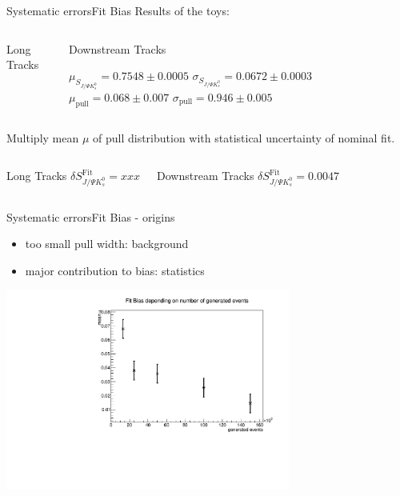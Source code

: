 \documentclass{beamer}
\newcommand{\SJPsi}{S_{J/\Psi K_s^0}}
\begin{document}
	\begin{frame}{Systematic errors}{Fit Bias}
	Results of the toys:
	\begin{columns}
	\begin{block}{Long Tracks}
    \centering
       
    \end{block}
	\begin{block}{Downstream Tracks}
    
        $\mu_{\SJPsi} = 0.7548 \pm 0.0005$
        $\sigma_{\SJPsi} = 0.0672 \pm 0.0003$
        $\mu_{\text{pull}} = 0.068 \pm 0.007$
        $\sigma_{\text{pull}} = 0.946 \pm 0.005$
    \end{block}
    \end{columns}
	\vspace{0.5cm} 
	Multiply mean $\mu$ of pull distribution with statistical uncertainty of nominal fit.
	\begin{columns}
	\begin{block}{Long Tracks}
    \centering
        $\delta\SJPsi^{\text{Fit}} = xxx$
    \end{block}
	\begin{block}{Downstream Tracks}
    \centering
        $\delta\SJPsi^{\text{Fit}} = 0.0047$
    \end{block}
    \end{columns}
    \end{frame}
	
	\begin{frame}{Systematic errors}{Fit Bias - origins}
    \begin{itemize}
    \item too small pull width: background
    \item major contribution to bias: statistics
    \end{itemize}
    \begin{center}
    \includegraphics[width = 0.7\textwidth]{fit_bias_statistics}
    \end{center}
    \end{frame}
	
\end{document}
